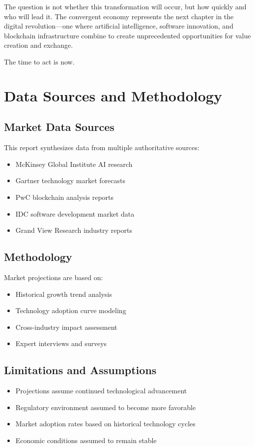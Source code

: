 \documentclass[11pt,a4paper]{report}
\begin{document}
The question is not whether this transformation will occur, but how quickly and who will lead it. The convergent economy represents the next chapter in the digital revolution---one where artificial intelligence, software innovation, and blockchain infrastructure combine to create unprecedented opportunities for value creation and exchange.

The time to act is now.

\appendix
\chapter{Data Sources and Methodology}

\section{Market Data Sources}

This report synthesizes data from multiple authoritative sources:

\begin{itemize}
\item McKinsey Global Institute AI research
\item Gartner technology market forecasts
\item PwC blockchain analysis reports
\item IDC software development market data
\item Grand View Research industry reports
\end{itemize}

\section{Methodology}

Market projections are based on:

\begin{itemize}
\item Historical growth trend analysis
\item Technology adoption curve modeling
\item Cross-industry impact assessment
\item Expert interviews and surveys
\end{itemize}

\section{Limitations and Assumptions}

\begin{itemize}
\item Projections assume continued technological advancement
\item Regulatory environment assumed to become more favorable
\item Market adoption rates based on historical technology cycles
\item Economic conditions assumed to remain stable
\end{itemize}
\end{document}
